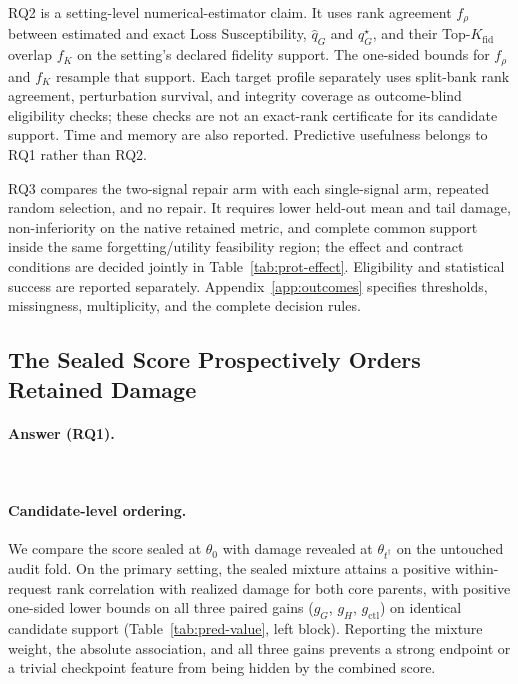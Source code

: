 RQ2 is a setting-level numerical-estimator claim. It uses rank agreement
$f_\rho$ between estimated and exact Loss Susceptibility,
$\widehat q_G$ and $q_G^\star$, and their Top-$K_{\mathrm{fid}}$ overlap $f_K$
on the setting's declared fidelity support. The one-sided bounds for $f_\rho$
and $f_K$ resample that support. Each target profile separately uses
split-bank rank agreement, perturbation survival, and integrity coverage as
outcome-blind eligibility checks; these checks are not an exact-rank
certificate for its candidate support. Time and memory are also reported.
Predictive usefulness belongs to RQ1 rather than RQ2.

RQ3 compares the two-signal repair arm with each single-signal arm, repeated
random selection, and no repair. It requires lower held-out mean and tail
damage, non-inferiority on the native retained metric, and complete common support
inside the same forgetting/utility feasibility region; the effect and
contract conditions are decided jointly in Table~\ref{tab:prot-effect}.
Eligibility and
statistical success are reported separately. Appendix~\ref{app:outcomes}
specifies thresholds, missingness, multiplicity, and the complete decision
rules.

\subsection{The Sealed Score Prospectively Orders Retained Damage}
\label{sec:exp-prediction}

\paragraph{Answer (RQ1).}
{\setlength{\emergencystretch}{3em}
\PredictionHeadline\ \TailHeadline\par}

\paragraph{Candidate-level ordering.}
We compare the score sealed at $\theta_0$ with damage revealed at
$\theta_{t^\dagger}$ on the untouched audit fold. On the primary setting,
the sealed mixture attains a positive within-request rank correlation with
realized damage for both core parents, with positive one-sided lower bounds
on all three paired gains ($g_G$, $g_H$, $g_{\mathrm{ctl}}$) on identical
candidate support (Table~\ref{tab:pred-value}, left block). Reporting the
mixture weight, the absolute association, and all three gains prevents a
strong endpoint or a trivial checkpoint feature from being hidden by the
combined score.

